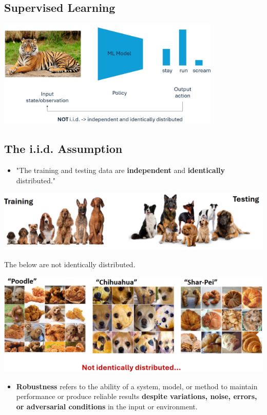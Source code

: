 \documentclass[10pt]{article}
\begin{document}
\subsection*{Supervised Learning}
\begin{center}
    \includegraphics*[width=0.8\textwidth]{L2_2.png}
\end{center}
\subsection*{The i.i.d. Assumption}
\begin{itemize}
	\item "The training and testing data are \textbf{independent} and \textbf{identically} distributed."
\end{itemize} 
\begin{center}
    \includegraphics*[width=\textwidth]{L2_3.png}
\end{center}
The below are not identically distributed.
\begin{center}
    \includegraphics*[width=\textwidth]{L2_4.png}
\end{center}
\begin{itemize}
	\item \textbf{Robustness} refers to the ability of a system, model, or method to maintain performance or produce reliable results \textbf{despite variations, noise, errors, or adversarial conditions} in the input or environment.
\end{itemize}
\end{document}
